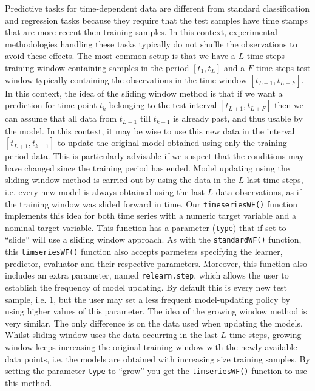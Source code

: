 \documentclass[10pt,a4paper]{article}
\begin{document}
Predictive tasks for time-dependent data are different from standard
classification and regression tasks because they require that the test
samples have time stamps that are more recent then training
samples. In this context, experimental methodologies handling these
tasks typically do not shuffle the observations to avoid these
effects. The most common setup is that we have a $L$ time steps
training window containing samples in the period $[t_1,t_L]$ and a $F$
time steps test window typically containing the observations in the
time window $[t_{L+1},t_{L+F}]$. In this context, the idea of the
sliding window method is that if we want a prediction for time point
$t_k$ belonging to the test interval $[t_{L+1},t_{L+F}]$ then we can
assume that all data from $t_{L+1}$ till $t_{k-1}$ is already past,
and thus usable by the model. In this context, it may be wise to use
this new data in the interval $[t_{L+1},t_{k-1}]$ to update the
original model obtained using only the training period data. This is
particularly advisable if we suspect that the conditions may have
changed since the training period has ended. Model updating using the
sliding window method is carried out by using the data in the $L$ last
time steps, i.e. every new model is always obtained using the last $L$
data observations, as if the training window was slided forward in
time. Our \texttt{timeseriesWF()} function implements this idea for
both time series with a numeric target variable and a nominal target
variable. This function has a parameter (\texttt{type}) that if set to
``slide'' will use a sliding window approach. As with the
\texttt{standardWF()} function, this \texttt{timseriesWF()} function
also accepts parmeters specifying the learner, predictor, evaluator
and their respective parameters. Moreover, this function also includes
an extra parameter, named \texttt{relearn.step}, which allows the user
to establish the frequency of model updating. By default this is every
new test sample, i.e. $1$, but the user may set a less frequent
model-updating policy by using higher values of this parameter.  The
idea of the growing window method is very similar. The only difference
is on the data used when updating the models. Whilst sliding window
uses the data occurring in the last $L$ time steps, growing window
keeps increasing the original training window with the newly available
data points, i.e. the models are obtained with increasing size
training samples. By setting the parameter \texttt{type} to ``grow''
you get the \texttt{timseriesWF()} function to use this method.
\end{document}
